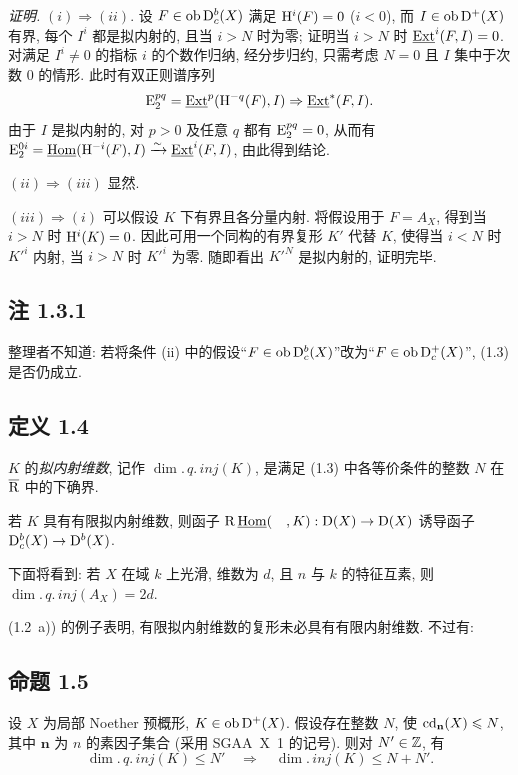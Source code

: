 \emph{证明.} $(i) \Rightarrow (ii)$. 设 $F \in \operatorname{ob} \mathrm{D}_c^{b}(X)$ 满足 $\mathrm{H}^i(F) = 0$ ($i < 0$), 而 $I \in \operatorname{ob} \mathrm{D}^{+}(X)$ 有界, 每个 $I^i$ 都是拟内射的, 且当 $i > N$ 时为零; 证明当 $i > N$ 时 $\underline{\operatorname{Ext}}^i(F,I) = 0$. 对满足 $I^i \neq 0$ 的指标 $i$ 的个数作归纳, 经分步归约, 只需考虑 $N = 0$ 且 $I$ 集中于次数 $0$ 的情形. 此时有双正则谱序列
\[
\mathrm{E}_2^{pq} = \underline{\operatorname{Ext}}^p(\mathrm{H}^{-q}(F),I) \Rightarrow \underline{\operatorname{Ext}}^{*}(F,I).
\]
由于 $I$ 是拟内射的, 对 $p > 0$ 及任意 $q$ 都有 $\mathrm{E}_2^{pq} = 0$, 从而有 $\mathrm{E}_2^{0i} = \underline{\operatorname{Hom}}(\mathrm{H}^{-i}(F),I) \xrightarrow{\sim} \underline{\operatorname{Ext}}^i(F,I)$, 由此得到结论.

$(ii) \Rightarrow (iii)$ 显然.

$(iii) \Rightarrow (i)$ 可以假设 $K$ 下有界且各分量内射. 将假设用于 $F = A_X$, 得到当 $i > N$ 时 $\mathrm{H}^i(K) = 0$. 因此可用一个同构的有界复形 $K'$ 代替 $K$, 使得当 $i < N$ 时 $K'^i$ 内射, 当 $i > N$ 时 $K'^i$ 为零. 随即看出 $K'^N$ 是拟内射的, 证明完毕.

\subsection*{注 1.3.1}
整理者不知道: 若将条件 (ii) 中的假设“$F \in \operatorname{ob} \mathrm{D}_c^{b}(X)$”改为“$F \in \operatorname{ob} \mathrm{D}_c^{+}(X)$”, (1.3) 是否仍成立.

\subsection*{定义 1.4}
$K$ 的\emph{拟内射维数}, 记作 $\dim.\,q.\,inj(K)$, 是满足 (1.3) 中各等价条件的整数 $N$ 在 $\overline{\mathrm R}$ 中的下确界.

若 $K$ 具有有限拟内射维数, 则函子 $\mathrm R\,\underline{\operatorname{Hom}}(\quad,K) : \mathrm{D}(X) \to \mathrm{D}(X)$ 诱导函子 $\mathrm{D}_c^{b}(X) \to \mathrm{D}^{b}(X)$.

下面将看到: 若 $X$ 在域 $k$ 上光滑, 维数为 $d$, 且 $n$ 与 $k$ 的特征互素, 则 $\dim.\,q.\,inj(A_X) = 2d$.

(1.2~a)) 的例子表明, 有限拟内射维数的复形未必具有有限内射维数. 不过有:

\subsection*{命题 1.5}
设 $X$ 为局部 Noether 预概形, $K \in \operatorname{ob} \mathrm{D}^{+}(X)$. 假设存在整数 $N$, 使 $\operatorname{cd}_{\mathbf{n}}(X) \leqslant N$, 其中 $\mathbf{n}$ 为 $n$ 的素因子集合 (采用 SGAA~X~1 的记号). 则对 $N' \in \mathbb Z$, 有
\[
\dim.\,q.\,inj(K) \leqslant N' \quad \Longrightarrow \quad \dim.\,inj(K) \leqslant N + N'.
\]

